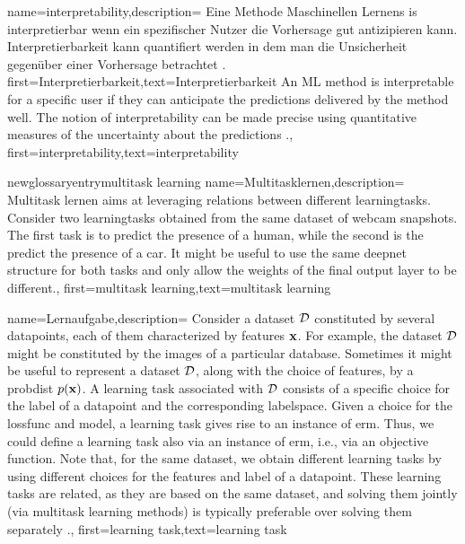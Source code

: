 {
{name={interpretability},description=
		{Eine Methode Maschinellen Lernens is interpretierbar  wenn ein spezifischer Nutzer die Vorhersage  gut antizipieren kann. 
		Interpretierbarkeit kann quantifiert werden in dem man die Unsicherheit gegenüber einer Vorhersage betrachtet \cite{JunXML2020}.
		first={Interpretierbarkeit},text={Interpretierbarkeit}		
		An ML method is interpretable for a specific user if 
			they can anticipate the \gls{prediction}s delivered by the method well. 
			The notion of interpretability can be made precise using quantitative 
			measures of the uncertainty about the \gls{prediction}s \cite{JunXML2020}.},
		first={interpretability},text={interpretability}
		}

		newglossaryentry{multitask learning}
		{name={Multitasklernen},description=
			{Multitask lernen aims at leveraging relations between 
			 different \gls{learningtask}s. Consider two \gls{learningtask}s obtained from the 
			 same \gls{dataset} of webcam snapshots. The first task is to predict the presence 
			 of a human, while the second is the predict the presence of a car. It might be useful 
			 to use the same \gls{deepnet} structure for both tasks and only allow the weights of 
			 the final output layer to be different.},
			first={multitask learning},text={multitask learning}
		}
		
		{name={Lernaufgabe},description=
			{Consider a \gls{dataset} $\mathcal{D}$ constituted by several \gls{datapoint}s, each of them 
			 characterized by \gls{feature}s ${\bf x}$. For example, the \gls{dataset} $\mathcal{D}$ 
			 might be constituted by the images of a particular database. Sometimes it might be useful 
			 to represent a \gls{dataset} $\mathcal{D}$, along with the choice of \gls{feature}s, by a \gls{probdist} $p({\bf x})$. 
			 A learning task associated with $\mathcal{D}$ consists of a specific 
			 choice for the \gls{label} of a \gls{datapoint} and the corresponding \gls{labelspace}. 
			 Given a choice for the \gls{lossfunc} and \gls{model}, a learning task gives rise to an 
			 instance of \gls{erm}. Thus, we could define a learning task also via an instance of \gls{erm}, i.e., 
			 via an objective function.  Note that, for the same \gls{dataset}, we obtain different learning tasks by using 
			 different choices for the \gls{feature}s and \gls{label} of a \gls{datapoint}. These learning 
			 tasks are related, as they are based on the same \gls{dataset}, and solving them jointly 
			 (via multitask learning methods) is typically preferable over solving them separately \cite{Caruana:1997wk,JungGaphLassoSPL,CSGraphSelJournal}.},
			first={learning task},text={learning task}
		}
		
}
